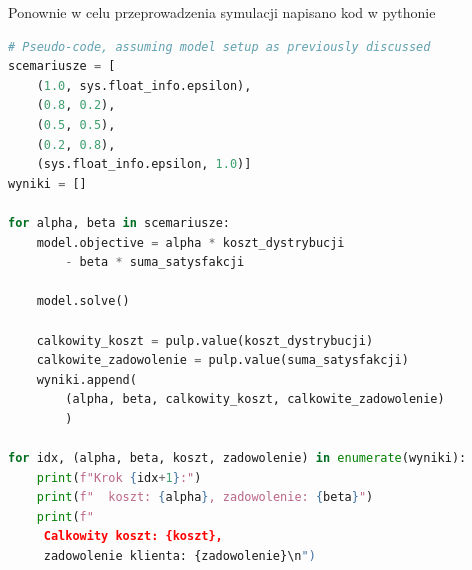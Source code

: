 Ponownie w celu przeprowadzenia symulacji napisano kod w pythonie 
\begin{lstlisting}[language=Python]
# Pseudo-code, assuming model setup as previously discussed
scemariusze = [
    (1.0, sys.float_info.epsilon),
    (0.8, 0.2),
    (0.5, 0.5),
    (0.2, 0.8),
    (sys.float_info.epsilon, 1.0)]
wyniki = []

for alpha, beta in scemariusze:
    model.objective = alpha * koszt_dystrybucji
        - beta * suma_satysfakcji

    model.solve()

    calkowity_koszt = pulp.value(koszt_dystrybucji)
    calkowite_zadowolenie = pulp.value(suma_satysfakcji)
    wyniki.append(
        (alpha, beta, calkowity_koszt, calkowite_zadowolenie)
        )

for idx, (alpha, beta, koszt, zadowolenie) in enumerate(wyniki):
    print(f"Krok {idx+1}:")
    print(f"  koszt: {alpha}, zadowolenie: {beta}")
    print(f" 
     Calkowity koszt: {koszt}, 
     zadowolenie klienta: {zadowolenie}\n")
\end{lstlisting}


